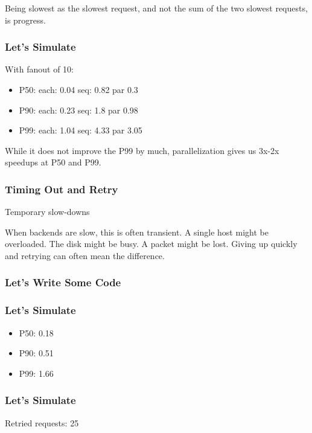 Being slowest as the slowest request,
and not the sum of the two slowest requests,
is progress.

\begin{frame}
\frametitle{Let's Simulate}

With fanout of 10:

\begin{itemize}
\item P50: each: 0.04 seq: 0.82 par 0.3
\item P90: each: 0.23 seq: 1.8 par 0.98
\item P99: each: 1.04 seq: 4.33 par 3.05
\end{itemize}

\end{frame}

While it does not improve the P99 by much,
parallelization gives us 3x-2x speedups
at P50 and P99.

\begin{frame}
\frametitle{Timing Out and Retry}

Temporary slow-downs

\end{frame}

When backends are slow, this is often transient.
A single host might be overloaded.
The disk might be busy.
A packet might be lost.
Giving up quickly and retrying can often mean the difference.

\begin{frame}
\frametitle{Let's Write Some Code}



\end{frame}


\begin{frame}
\frametitle{Let's Simulate}

\begin{itemize}
\item P50: 0.18
\item P90: 0.51
\item P99: 1.66
\end{itemize}

\end{frame}

\begin{frame}
\frametitle{Let's Simulate}

Retried requests: 25%

\end{frame}


